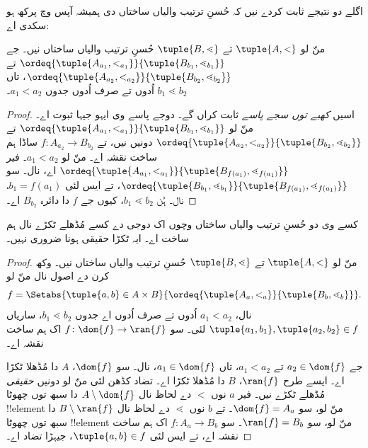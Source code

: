 \documentclass[../../../include/open-logic-section]{subfiles}
\begin{document}
اگلے دو نتیجے ثابت کردے نیں کہ حُسنِ ترتیب والیاں ساختاں دی ہمیشہ آپس وچ پرکھ ہو سکدی اے:

\begin{lem}
منّ لو $\tuple{A, <}$ تے $\tuple{B, \lessdot}$ حُسنِ ترتیب والیاں ساختاں نیں۔
جے $\ordeq{\tuple{A_{a_1}, <_{a_1}}}{\tuple{B_{b_1}, \lessdot_{b_1}}}$
تے $\ordeq{\tuple{A_{{a_2}}, <_{a_2}}}{\tuple{B_{{b_2}}, \lessdot_{b_2}}}$،
تاں ${a_1}  < {a_2} \text{ اُدوں تے صرف اُدوں جدوں }{b_1} \lessdot {b_2}$۔
\end{lem}

\begin{proof}
اسیں \emph{کھبے توں سجے پاسے} ثابت کراں گے۔ دوجے پاسے وی ایہو جیہا ثبوت اے۔
منّ لو $\ordeq{\tuple{A_{a_1}, <_{a_1}}}{\tuple{B_{b_1}, \lessdot_{b_1}}}$
تے $\ordeq{\tuple{A_{{a_2}}, <_{a_2}}}{\tuple{B_{{b_2}}, \lessdot_{b_2}}}$
دونیں نیں، تے $f \colon A_{{a_2}} \to B_{{b_2}}$ ساڈا ہم ساخت نقشہ اے۔
منّ لو ${a_1} < {a_2}$۔ فیر
$\ordeq{\tuple{A_{a_1}, <_{a_1}}}{\tuple{B_{f({a_1})}, \lessdot_{f({a_1})}}}$
اے،  نال۔ سو
$\ordeq{\tuple{B_{b_1}, \lessdot_{b_1}}}{\tuple{B_{f({a_1})}, \lessdot_{f({a_1})}}}$،
تے ایس لئی ${b_1} = f({a_1})$،  نال۔
ہُن ${b_1} \lessdot {b_2}$، کیوں جے $f$ دا دائرہ $B_{{b_2}}$ اے۔
\end{proof}

\begin{thm}
کسے وی دو حُسنِ ترتیب والیاں ساختاں وچوں اک دوجی دے کسے مُڈھلے ٹکڑے
نال ہم ساخت اے۔ ایہ ٹکڑا حقیقی ہونا ضروری نہیں۔
\end{thm}

\begin{proof}
منّ لو $\tuple{A, <}$ تے $\tuple{B, \lessdot}$ حُسنِ ترتیب والیاں ساختاں نیں۔
وکھ کرن دے اصول نال منّ لو
\[
	f = \Setabs{\tuple{a, b} \in A \times B}{
		\ordeq{\tuple{A_a, <_a}}{\tuple{B_b, \lessdot_b}}}.
\]
 نال، $a_1 < a_2$ اُدوں تے صرف اُدوں اے جدوں
$b_1 \lessdot b_2$، ساریاں $\tuple{a_1, b_1}, \tuple{a_2, b_2} \in f$
لئی۔ سو $f \colon \dom{f} \to \ran{f}$ اک ہم ساخت نقشہ اے۔

جے $a_2 \in \dom{f}$ تے $a_1 < a_2$، تاں $a_1 \in \dom{f}$،
 نال۔ سو $\dom{f}$، $A$ دا مُڈھلا ٹکڑا اے۔
ایسے طرح $\ran{f}$، $B$ دا مُڈھلا ٹکڑا اے۔ تضاد کڈھن لئی منّ لو دونیں
\emph{حقیقی} مُڈھلے ٹکڑے نیں۔ فیر $a$ نوں $<$ دے لحاظ نال
$A \setminus \dom{f}$ دا سبھ توں چھوٹا !!{element} منّ لو، سو
$\dom{f} = A_a$۔ تے $b$ نوں $\lessdot$ دے لحاظ نال
$B \setminus \ran{f}$ دا سبھ توں چھوٹا !!{element} منّ لو، سو
$\ran{f} = B_b$۔ سو $f \colon A_a \to B_b$ اک ہم ساخت نقشہ اے،
تے ایس لئی $\tuple{a, b} \in f$، جیہڑا تضاد اے۔
\end{proof}
\end{document}
